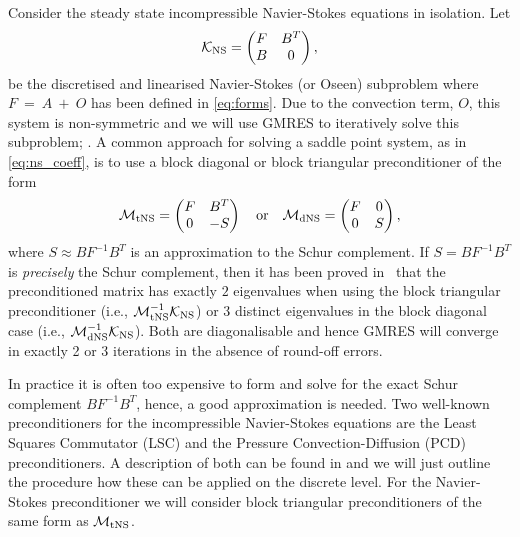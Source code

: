 Consider the steady state incompressible Navier-Stokes equations in isolation. Let
\begin{equation}
\label{eq:ns_coeff}
\mathcal{K}_{\rm NS}=
\begin{pmatrix}
F & B^T \\
B & 0
\end{pmatrix},
\end{equation}
be the discretised and linearised Navier-Stokes (or Oseen) subproblem where $F~=~A~+~O$ has been defined in \eqref{eq:forms}. Due to the convection term, $O$, this  system is non-symmetric and we will use GMRES to iteratively solve this subproblem; \cite{saad1986gmres}. A common approach for solving a saddle point system, as in \eqref{eq:ns_coeff}, is to use a block diagonal or block triangular preconditioner of the form
\begin{equation}
\label{eq:ns_pc_upper}
\mathcal{M}_{\rm tNS} =
\begin{pmatrix}
F & B^T \\
0 & -S
\end{pmatrix} \quad \mbox{or} \quad
\mathcal{M}_{\rm dNS} =
\begin{pmatrix}
F & 0 \\
0 & S
\end{pmatrix},
\end{equation}
where $S\approx B F^{-1} B^T$ is an approximation to the Schur complement. If $S = B F^{-1} B^T$ is {\em precisely} the Schur complement, then it has been proved in~\cite{murphy2000note} that the preconditioned matrix has exactly $2$ eigenvalues when using the block triangular preconditioner  (i.e., $\mathcal{M}_{\rm tNS}^{-1}\mathcal{K}_{\rm NS}$) or $3$ distinct eigenvalues in the block diagonal case  (i.e., $\mathcal{M}_{\rm dNS}^{-1}\mathcal{K}_{\rm NS}$). Both are diagonalisable and hence GMRES will converge in exactly 2 or 3 iterations in the absence of round-off errors.

In practice it is often too expensive to form and solve for the exact Schur complement $B F^{-1} B^T$, hence, a good approximation is needed. Two well-known preconditioners for the incompressible Navier-Stokes equations are the Least Squares Commutator (LSC) and the Pressure Convection-Diffusion (PCD) preconditioners. A description of both can be found in \cite{elman2005finite} and we will just outline the procedure how these can be applied on the discrete level. For the Navier-Stokes preconditioner we will consider block triangular preconditioners of the same form as $\mathcal{M}_{\rm tNS}$.

